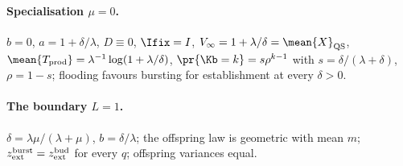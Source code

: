 \paragraph{Specialisation $\mu=0$.} $b=0$, $a=1+\delta/\lambda$, $D\equiv0$,
$\Ifix=I$, $V_\infty=1+\lambda/\delta=\mean{X}_{\rm QS}$,
$\mean{T_{\rm prod}}=\lambda^{-1}\log(1+\lambda/\delta)$,
$\pr{\Kb=k}=s\rho^{k-1}$ with $s=\delta/(\lambda+\delta)$, $\rho=1-s$;
flooding favours bursting for establishment at every $\delta>0$.

\paragraph{The boundary $L=1$.} $\delta=\lambda\mu/(\lambda+\mu)$,
$b=\delta/\lambda$; the offspring law is geometric with mean $m$;
$z_{\rm ext}^{\rm burst}=z_{\rm ext}^{\rm bud}$ for every $q$; offspring
variances equal.

\endgroup
\restoretoc
